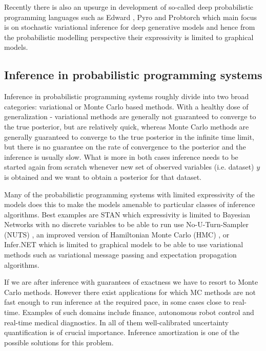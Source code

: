 \documentclass[12pt]{article}
\begin{document}
Recently there is also an upsurge in development of so-called deep probabilistic programming languages such as Edward \citep{TranEtAl2016}, Pyro \citep{Pyro2018} and Probtorch \citep{Siddharth2017} which main focus is on stochastic variational inference for deep generative models and hence from the probabilistic modelling perspective their expressivity is limited to graphical models.





\subsection{Inference in probabilistic programming systems}
\label{sec:inference-prob-prog}

Inference in probabilistic programming systems roughly divide into two broad categories: variational or Monte Carlo based methods.
With a healthy dose of generalization - variational methods are generally not guaranteed to converge to the true posterior, but are relatively quick, whereas Monte Carlo methods are generally guaranteed to converge to the true posterior in the infinite time limit, but there is no guarantee on the rate of convergence to the posterior and the inference is usually slow.
What is more in both cases inference needs to be started again from scratch whenever new set of observed variables (i.e. dataset) $y$ is obtained and we want to obtain a posterior for that dataset.  

Many of the probabilistic programming systems with limited expressivity of the models does this to make the models amenable to particular classes of inference algorithms. 
Best examples are STAN which expressivity is limited to Bayesian Networks with no discrete variables to be able to run use No-U-Turn-Sampler (NUTS) \citep{NUTS}, an improved version of Hamiltonian Monte Carlo (HMC) \citep{HMC}, or Infer.NET which is limited to graphical models to be able to use variational methods such as variational message passing \citep{variationalmessagepassing} and expectation propagation \citep{EP} algorithms.

If we are after inference with guarantees of exactness we have to resort to Monte Carlo methods.
However there exist applications for which MC methods are not fast enough to run inference at the required pace, in some cases close to real-time.
Examples of such domains include finance, autonomous robot control and real-time medical diagnostics.
In all of them well-calibrated uncertainty quantification is of crucial importance.
Inference amortization is one of the possible solutions for this problem.
\end{document}
